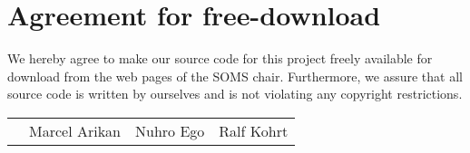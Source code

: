 \documentclass[11pt]{article}
\begin{document}

\newpage


\newpage
\section*{Agreement for free-download}
\bigskip


\bigskip


\large We hereby agree to make our source code for this project freely available for download from the web pages of the SOMS chair. Furthermore, we assure that all source code is written by ourselves and is not violating any copyright restrictions.

\begin{center}

\bigskip


\bigskip


\begin{tabular}{@{}p{3cm}@{}p{4cm}@{}@{}p{4cm}@{}@{}p{4cm}@{}}
\begin{minipage}{2cm}

\end{minipage}
&
\begin{minipage}{4cm}
\vspace{2mm} \large Marcel Arikan

 \vspace{\baselineskip}

\end{minipage}
&
\begin{minipage}{4cm}
\vspace{2mm} \large Nuhro Ego

 \vspace{\baselineskip}

\end{minipage}
&
\begin{minipage}{4cm}

\large Ralf Kohrt

\end{minipage}
\end{tabular}


\end{center}
\newpage




\end{document}
